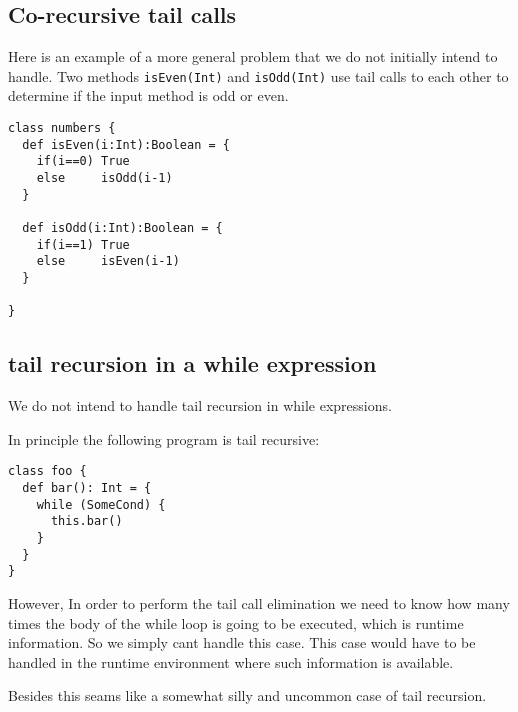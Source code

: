 \subsection{Co-recursive tail calls}
\label{sec:corecursionexample}

Here is an example of a more general problem that we do not initially intend to handle. Two methods \texttt{isEven(Int)} and \texttt{isOdd(Int)} use tail calls to each other to determine if the input method is odd or even.

\begin{lstlisting}
class numbers {
  def isEven(i:Int):Boolean = {
    if(i==0) True
    else     isOdd(i-1)
  }
  
  def isOdd(i:Int):Boolean = {
    if(i==1) True
    else     isEven(i-1)
  }
  
}
\end{lstlisting}


\subsection{tail recursion in a while expression}

We do not intend to handle tail recursion in while expressions.

In principle the following program is tail recursive:


\begin{lstlisting}
class foo {
  def bar(): Int = {
    while (SomeCond) {
      this.bar()
    } 
  }
}

\end{lstlisting}
However, In order to perform the tail call elimination we need to know how many times the body of the while loop is going to be executed, which is runtime information. So we simply cant handle this case. This case would have to be handled in the runtime environment where such information is available.

Besides this seams like a somewhat silly and uncommon case of tail recursion.

